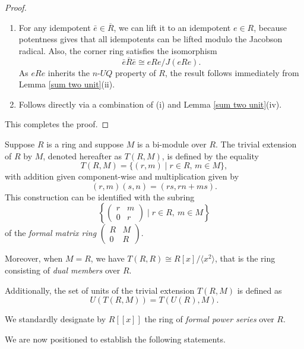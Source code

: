 \documentclass[12pt]{amsart}
\theoremstyle{definition}
\begin{document}
\begin{proof}
\begin{enumerate}
\item
For any idempotent $\bar{e} \in \overline{R}$, we can lift it to an idempotent $e \in R$, because potentness gives that all idempotents can be lifted modulo the Jacobson radical. Also, the corner ring satisfies the isomorphism $$\bar{e}\overline{R}\bar{e} \cong eRe/J(eRe).$$ As $eRe$ inherits the $n$-$UQ$ property of $R$, the result follows immediately from Lemma \ref{sum two unit}(ii).
\item	
Follows directly via a combination of (i) and Lemma \ref{sum two unit}(iv).
\end{enumerate}

This completes the proof.
\end{proof}

Suppose \( R \) is a ring and suppose \( M \) is a bi-module over \( R \). The trivial extension of \( R \) by \( M \), denoted hereafter as \( T(R, M) \), is defined by the equality
\[
T(R, M) = \{ (r, m) \mid r \in R,\, m \in M \},
\]
with addition given component-wise and multiplication given by
\[
(r, m)(s, n) = (rs, rn + ms).
\]
This construction can be identified with the subring
\[
\left\{ \begin{pmatrix} r & m \\ 0 & r \end{pmatrix} \mid r \in R,\ m \in M \right\}
\]
of the {\it formal matrix ring} \( \begin{pmatrix} R & M \\ 0 & R \end{pmatrix} \).

Moreover, when \( M = R \), we have \( T(R, R) \cong R[x]/\langle x^2 \rangle \), that is the ring consisting of {\it dual members} over \( R \).

Additionally, the set of units of the trivial extension \( T(R, M) \) is defined as
\[
U(T(R, M)) = T(U(R), M).
\]

We standardly designate by \( R[[x]] \) the ring of {\it formal power series} over \( R \).

\medskip

We are now positioned to establish the following statements.
\end{document}
